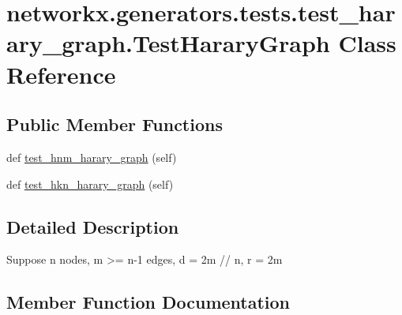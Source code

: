 \hypertarget{classnetworkx_1_1generators_1_1tests_1_1test__harary__graph_1_1TestHararyGraph}{}\section{networkx.\+generators.\+tests.\+test\+\_\+harary\+\_\+graph.\+Test\+Harary\+Graph Class Reference}
\label{classnetworkx_1_1generators_1_1tests_1_1test__harary__graph_1_1TestHararyGraph}
\subsection*{Public Member Functions}
\begin{DoxyCompactItemize}
\item 
def \hyperlink{classnetworkx_1_1generators_1_1tests_1_1test__harary__graph_1_1TestHararyGraph_a06834b6bec625dd8fac686c270b2dfea}{test\+\_\+hnm\+\_\+harary\+\_\+graph} (self)
\item 
def \hyperlink{classnetworkx_1_1generators_1_1tests_1_1test__harary__graph_1_1TestHararyGraph_aacbc6562c13cfaa2f494ba8ac134749c}{test\+\_\+hkn\+\_\+harary\+\_\+graph} (self)
\end{DoxyCompactItemize}


\subsection{Detailed Description}
\begin{DoxyVerb}Suppose n nodes, m >= n-1 edges, d = 2m // n, r = 2m %
\end{DoxyVerb}
 

\subsection{Member Function Documentation}
\mbox{\label{classnetworkx_1_1generators_1_1tests_1_1test__harary__graph_1_1TestHararyGraph_aacbc6562c13cfaa2f494ba8ac134749c}} 
